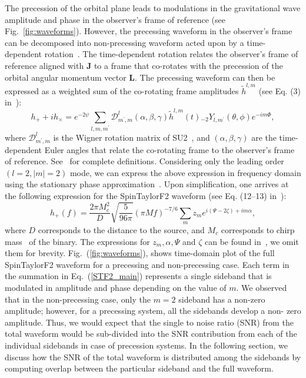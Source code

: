 The precession of the orbital plane leads to modulations in the gravitational
wave amplitude and phase in the observer's frame of reference (see Fig.~\ref{fig:waveforms}).
However, the precessing waveform in the observer's frame can be decomposed into
non-precessing waveform acted upon by a time-dependent rotation~\cite{Boyle2011,
Rotation}. The time-dependent rotation relates the observer's frame of reference
aligned with $\mathbf{J}$ to a frame that co-rotates with the precession of the
orbital angular momentum vector $\mathbf{L}$. The precessing waveform can then
be expressed as a weighted sum of the co-rotating frame amplitudes
$\tilde{h}^{l,m}$ (see Eq. (3) in~\cite{Lundgren2014}):
\begin{equation}   
h_{+} + i h_{\times} = e^{-2 \psi}
\sum_{l,m,m^{\prime}} \mathcal{D}^{l}_{m^{\prime},m} \left(\alpha, \beta, \gamma\right)
\tilde{h}^{l,m}(t){}_{-2}Y_{l,m^{\prime}}\left(\theta,\phi\right)e^{-i m \Phi},
\end{equation}   
where $\mathcal{D}^{l}_{m^{\prime},m}$ is the Wigner rotation matrix of
SU2~\cite{Boyle2011}, and $(\alpha, \beta, \gamma)$ are the time- dependent
Euler angles that relate the co-rotating frame to the observer's frame of
reference. See~\cite{Lundgren2014} for complete definitions. Considering only
the leading order $(l=2, |m| = 2)$ mode, we can express the above expression in
frequency domain using the stationary phase approximation~\cite{Lundgren2014,
Creighton}.  Upon simplification, one arrives at the following expression for
the SpinTaylorF2 waveform (see Eq. (12--13) in~\cite{Lundgren2014}):
\begin{equation}  
\label{STF2_main} 
h_{+}(f) =
\dfrac{2\pi M_{c}^{2}}{D}\sqrt{\dfrac{5}{96\pi}}(\pi M
f)^{-7/6}\sum_{m}z_{m}e^{i(\Psi - 2\zeta) + i m \alpha},
\end{equation} 
where $D$ corresponds to the distance to the source, and $M_{c}$ corresponds to
chirp mass~\cite{Creighton} of the binary. The expressions for $z_{m}, \alpha,
\Psi$ and $\zeta$  can be found in~\cite{Lundgren2014}, we omit them for
brevity. Fig.~(\ref{fig:waveforms}), shows  time-domain plot of the full
SpinTaylorF2 waveform for a precessing and non-precessing case. Each term in the
summation in Eq.~(\ref{STF2_main}) represents a single sideband that is
modulated in amplitude and phase depending on the value of $m$.  We observed
that in  the non-precessing case, only the $m=2$ sideband has a non-zero
amplitude; however, for a precessing system, all the sidebands develop a non-
zero amplitude. Thus, we would expect that the single to noise ratio (SNR) from
the total waveform would be sub-divided into the SNR contribution from each of
the individual sidebands in case of precession systems. In the following section, 
we discuss how the SNR of the total waveform is distributed among the sidebands
by computing overlap between the particular sideband and the full waveform.






